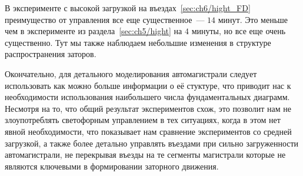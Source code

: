 В эксперименте с высокой загрузкой на въездах~\ref{sec:ch6/hight_FD} преимущество от управления все еще существенное~--- \(14\) минут.
Это меньше чем в эксперименте из раздела~\ref{sec:ch5/hight} на \(4\) минуты, но все еще очень существенно.
Тут мы также наблюдаем небольшие изменения в структуре распространения заторов.

Окончательно, для детального моделирования автомагистрали следует использовать как можно больше информации о её стуктуре, что приводит нас к необходимости использования наибольшего числа фундаментальных диаграмм.
Несмотря на то, что общий результат экспериментов схож, это позволит нам не злоупотреблять светофорным управлением в тех ситуациях, когда в этом нет явной необходимости, что показывает нам сравнение экспериментов со средней загрузкой, 
а также более детально управлять въездами при сильно загруженности автомагистрали, не перекрывая въезды на те сегменты магистрали которые не являются ключевыми в формировании заторного движения.


\clearpage